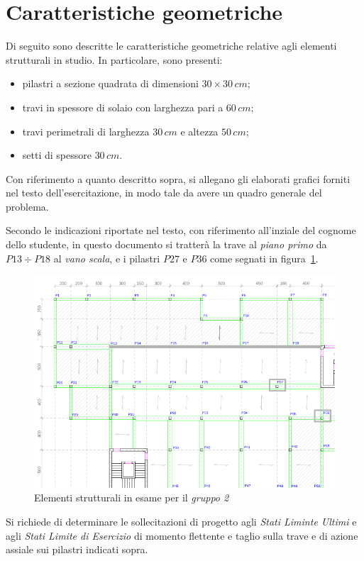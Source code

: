 \section{Caratteristiche geometriche}\label{sec:geomCar}
Di seguito sono descritte le caratteristiche geometriche relative agli elementi strutturali in studio. In particolare, sono presenti:
\begin{itemize}
 \item pilastri a sezione quadrata di dimensioni $30 \times 30\,\si{cm}$;
 \item travi in spessore di solaio con larghezza pari a $60\,\si{cm}$;
 \item travi perimetrali di larghezza $30\,\si{cm}$ e altezza $50\,\si{cm}$;
 \item setti di spessore $30\,\si{cm}$.
\end{itemize}

Con riferimento a quanto descritto sopra, si allegano gli elaborati grafici forniti nel testo dell'esercitazione, in modo tale da avere un quadro generale del problema.
\cleardoublepage





\cleardoublepage
Secondo le indicazioni riportate nel testo, con riferimento all'inziale del cognome dello studente, in questo documento si tratterà la trave al \emph{piano primo} da $P13 \div P18$ al \emph{vano scala}, e i pilastri $P27$ e $P36$ come segnati in figura~\ref{fig:pianoPrimo}.
\begin{figure}
 \centering
 \includegraphics[width=\textwidth]{../../pianoPrimo_esercitazione.png}
 \caption{Elementi strutturali in esame per il \emph{gruppo 2}}
 \label{fig:pianoPrimo}
\end{figure}

Si richiede di determinare le sollecitazioni di progetto agli \emph{Stati Liminte Ultimi} e agli \emph{Stati Limite di Esercizio} di momento flettente e taglio sulla trave e di azione assiale sui pilastri indicati sopra. 
\cleardoublepage
